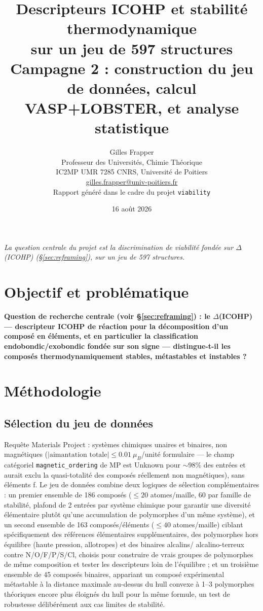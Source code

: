 \documentclass[11pt,a4paper]{article}
\title{\bfseries Descripteurs ICOHP et stabilité thermodynamique \\
sur un jeu de 597 structures \\
\large Campagne 2 : construction du jeu de données, calcul VASP+LOBSTER,
et analyse statistique}
\author{Gilles Frapper \\ Professeur des Universités, Chimie Théorique \\ IC2MP UMR 7285 CNRS, Université de Poitiers \\ \href{mailto:gilles.frapper@univ-poitiers.fr}{gilles.frapper@univ-poitiers.fr}\\[4pt] \small Rapport généré dans le cadre du projet \texttt{viability}}
\date{16 août 2026}
\begin{document}
\maketitle

\begin{center}
\small\itshape La question centrale du projet est la discrimination de
viabilité fondée sur $\Delta$(ICOHP) (\S\ref{sec:reframing}), sur un jeu
de 597 structures.
\end{center}

\tableofcontents
\newpage

\section{Objectif et problématique}

\textbf{Question de recherche centrale (voir \S\ref{sec:reframing}) : le
$\Delta$(ICOHP) --- descripteur ICOHP de réaction pour la décomposition
d'un composé en éléments, et en particulier la classification
endobondic/exobondic fondée sur son signe --- distingue-t-il les
composés thermodynamiquement stables, métastables et instables ?}

\section{Méthodologie}

\subsection{Sélection du jeu de données}

Requête Materials Project : systèmes chimiques unaires et binaires, non
magnétiques ($|\text{aimantation totale}| \leq 0.01~\mu_B$/unité
formulaire --- le champ catégoriel \texttt{magnetic\_ordering} de MP est
\og{}Unknown\fg{} pour $\sim$98\% des entrées et aurait exclu la
quasi-totalité des composés réellement non magnétiques), sans éléments
f. Le jeu de données combine deux logiques de
sélection complémentaires : un premier ensemble de 186 composés
($\leq 20$ atomes/maille, 60 par famille de stabilité, plafond de 2
entrées par système chimique pour garantir une diversité élémentaire
plutôt qu'une accumulation de polymorphes d'un même système), et un
second ensemble de 163 composés/éléments ($\leq 40$ atomes/maille)
ciblant spécifiquement des
références élémentaires supplémentaires, des polymorphes hors
équilibre (haute pression, allotropes) et des binaires alcalins/
alcalino-terreux contre N/O/F/P/S/Cl, choisis pour construire de vrais
groupes de polymorphes de même composition et tester les descripteurs
loin de l'équilibre ; et un troisième ensemble de 45 composés
binaires, appariant un composé expérimental métastable à la distance
maximale au-dessus du hull convexe à 1--3 polymorphes théoriques
encore plus éloignés du hull pour la même formule, un test de
robustesse délibérément aux cas limites de stabilité.
\end{document}

